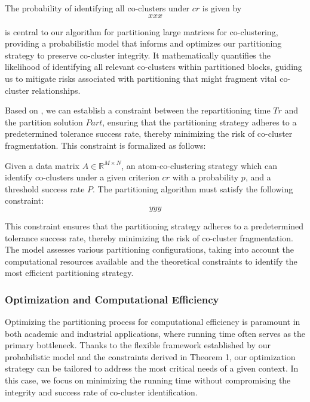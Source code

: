 The probability of identifying all co-clusters under $cr$ is given by
\begin{equation}
    \label{eq:prob_of_identifying_all_co_clusters}
    xxx
\end{equation}

 is central to our algorithm for partitioning large matrices for co-clustering, providing a probabilistic model that informs and optimizes our partitioning strategy to preserve co-cluster integrity. It mathematically quantifies the likelihood of identifying all relevant co-clusters within partitioned blocks, guiding us to mitigate risks associated with partitioning that might fragment vital co-cluster relationships. 

Based on , we can establish a constraint between the repartitioning time $Tr$ and the partition solution $Part$, ensuring that the partitioning strategy adheres to a predetermined tolerance success rate, thereby minimizing the risk of co-cluster fragmentation. This constraint is formalized as follows:

\begin{theorem}
    \label{thm:rep_partitioning_constraint}
    Given a data matrix $A \in \mathbb{R}^{M \times N}$, an atom-co-clustering strategy which can identify co-clusters under a given criterion $cr$ with a probability $p$, and a threshold success rate $P$. The partitioning algorithm must satisfy the following constraint:
    \begin{equation}
        \label{eq:rep_partitioning_constraint}
        yyy
    \end{equation}
\end{theorem}


This constraint ensures that the partitioning strategy adheres to a predetermined tolerance success rate, thereby minimizing the risk of co-cluster fragmentation. The model assesses various partitioning configurations, taking into account the computational resources available and the theoretical constraints to identify the most efficient partitioning strategy. 

\subsubsection{Optimization and Computational Efficiency}
Optimizing the partitioning process for computational efficiency is paramount in both academic and industrial applications, where running time often serves as the primary bottleneck. Thanks to the flexible framework established by our probabilistic model and the constraints derived in Theorem 1, our optimization strategy can be tailored to address the most critical needs of a given context. In this case, we focus on minimizing the running time without compromising the integrity and success rate of co-cluster identification.

